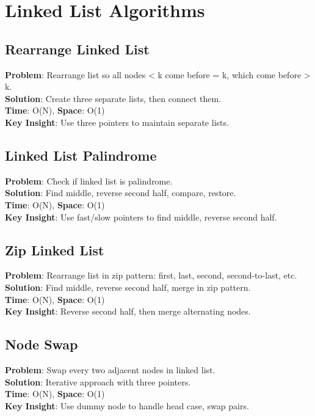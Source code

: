 \documentclass{report}
\begin{document}
\section{Linked List Algorithms}

\subsection{Rearrange Linked List}
\textbf{Problem}: Rearrange list so all nodes < k come before = k, which come before > k.\\
\textbf{Solution}: Create three separate lists, then connect them.\\
\textbf{Time}: O(N), \textbf{Space}: O(1)\\
\textbf{Key Insight}: Use three pointers to maintain separate lists.

\subsection{Linked List Palindrome}
\textbf{Problem}: Check if linked list is palindrome.\\
\textbf{Solution}: Find middle, reverse second half, compare, restore.\\
\textbf{Time}: O(N), \textbf{Space}: O(1)\\
\textbf{Key Insight}: Use fast/slow pointers to find middle, reverse second half.

\subsection{Zip Linked List}
\textbf{Problem}: Rearrange list in zip pattern: first, last, second, second-to-last, etc.\\
\textbf{Solution}: Find middle, reverse second half, merge in zip pattern.\\
\textbf{Time}: O(N), \textbf{Space}: O(1)\\
\textbf{Key Insight}: Reverse second half, then merge alternating nodes.

\subsection{Node Swap}
\textbf{Problem}: Swap every two adjacent nodes in linked list.\\
\textbf{Solution}: Iterative approach with three pointers.\\
\textbf{Time}: O(N), \textbf{Space}: O(1)\\
\textbf{Key Insight}: Use dummy node to handle head case, swap pairs.
\end{document}
